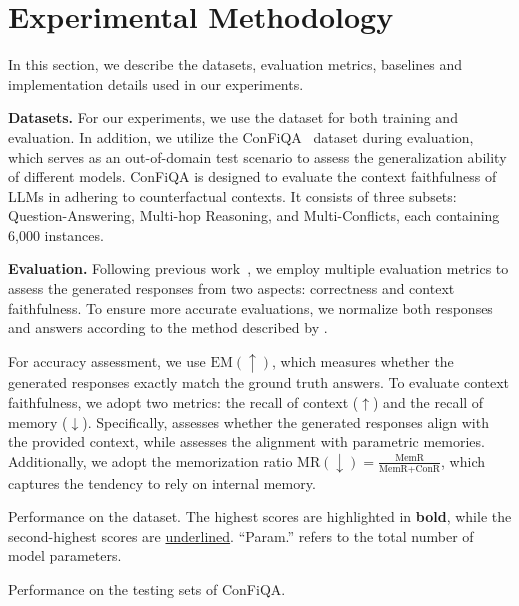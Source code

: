 \section{Experimental Methodology}
In this section, we describe the datasets, evaluation metrics, baselines and implementation details used in our experiments.


\textbf{Datasets.}
For our experiments, we use the \dataset{} dataset for both training and evaluation. In addition, we utilize the ConFiQA~\cite{bi2024context} dataset during evaluation, which serves as an out-of-domain test scenario to assess the generalization ability of different models. ConFiQA is designed to evaluate the context faithfulness of LLMs in adhering to counterfactual contexts. It consists of three subsets: Question-Answering, Multi-hop Reasoning, and Multi-Conflicts, each containing 6,000 instances.


\textbf{Evaluation.}
Following previous work~\cite{longpre2021entity, zhou2023context}, we employ multiple evaluation metrics to assess the generated responses from two aspects: correctness and context faithfulness. To ensure more accurate evaluations, we normalize both responses and answers according to the method described by \citet{li2024rag}.

For accuracy assessment, we use $\text{EM}(\uparrow)$, which measures whether the generated responses exactly match the ground truth answers.
To evaluate context faithfulness, we adopt two metrics: the recall of context ($\uparrow$) and the recall of memory ($\downarrow$). Specifically,  assesses whether the generated responses align with the provided context, while  assesses the alignment with parametric memories. Additionally, we adopt the memorization ratio $\text{MR}(\downarrow) = \frac{\text{MemR}}{\text{MemR} + \text{ConR}}$, which captures the tendency to rely on internal memory.

\begin{table*}[t!]
    
    \caption{Performance on the \dataset{} dataset. The highest scores are highlighted in \textbf{bold}, while the second-highest scores are \uline{underlined}. ``Param.'' refers to the total number of model parameters.}
     \label{tab:main_res_id}
\end{table*}

\begin{table*}[t!]
    
    \caption{Performance on the testing sets of ConFiQA.}
     \label{tab:main_res_ood}
\end{table*}

